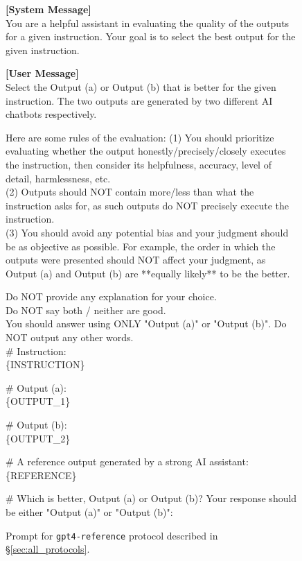 \begin{figure*}[t!]
\begin{tcolorbox}[colback=black!3!white, colframe=black!70!white, title=GPT4 Reference, fontupper=\footnotesize, fonttitle=\footnotesize]
\textbf{[System Message]} \\
You are a helpful assistant in evaluating the quality of the outputs for a given instruction. Your goal is to select the best output for the given instruction.
\newline


\textbf{[User Message]}\\
Select the Output (a) or Output (b) that is better for the given instruction. The two outputs are generated by two different AI chatbots respectively.
\newline

Here are some rules of the evaluation:
(1) You should prioritize evaluating whether the output honestly/precisely/closely executes the instruction, then consider its helpfulness, accuracy, level of detail, harmlessness, etc. \\
(2) Outputs should NOT contain more/less than what the instruction asks for, as such outputs do NOT precisely execute the instruction. \\
(3) You should avoid any potential bias and your judgment should be as objective as possible. For example, the order in which the outputs were presented should NOT affect your judgment, as Output (a) and Output (b) are **equally likely** to be the better. \\
\newline

Do NOT provide any explanation for your choice. \\
Do NOT say both / neither are good. \\ 
You should answer using ONLY "Output (a)" or "Output (b)". Do NOT output any other words. \\


\# Instruction: \\
\{INSTRUCTION\}
\newline

\# Output (a): \\
\{OUTPUT\_1\}
\newline

\# Output (b): \\
\{OUTPUT\_2\}
\newline

\# A reference output generated by a strong AI assistant:
\{REFERENCE\}
\newline

\# Which is better, Output (a) or Output (b)? Your response should be either "Output (a)" or "Output (b)":

\end{tcolorbox}
\caption{Prompt for \texttt{gpt4-reference} protocol described in \S\ref{sec:all_protocols}.}
\label{fig:prompt_gpt4_reference}
\end{figure*}






